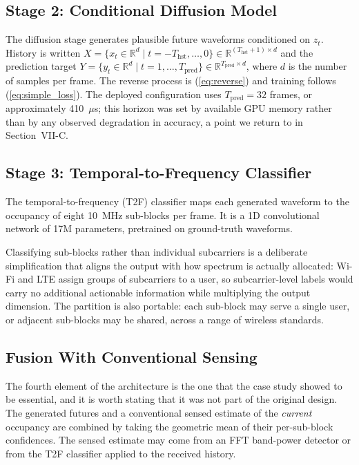 \documentclass[lettersize,journal]{IEEEtran}
\newcommand{\us}{\ensuremath{\mu}s}
\begin{document}
\subsection{\textbf{Stage 2: Conditional Diffusion Model}}
The diffusion stage generates plausible future waveforms conditioned on
$z_t$. History is written
$X = \{x_t \in \mathbb{R}^d \mid t = -T_{\mathrm{hst}}, \ldots, 0\}
\in \mathbb{R}^{(T_{\mathrm{hst}}+1)\times d}$
and the prediction target
$Y = \{y_t \in \mathbb{R}^d \mid t = 1, \ldots, T_{\mathrm{pred}}\}
\in \mathbb{R}^{T_{\mathrm{pred}}\times d}$,
where $d$ is the number of samples per frame. The reverse process is
(\ref{eq:reverse}) and training follows (\ref{eq:simple_loss}). The
deployed configuration uses $T_{\mathrm{pred}} = 32$ frames, or
approximately 410~\us; this horizon was set by available GPU memory
rather than by any observed degradation in accuracy, a point we return
to in Section~VII-C.

\subsection{\textbf{Stage 3: Temporal-to-Frequency Classifier}}
The temporal-to-frequency (T2F) classifier maps each generated waveform
to the occupancy of eight 10~MHz sub-blocks per frame. It is a 1D
convolutional network of 17M parameters, pretrained on ground-truth
waveforms.

Classifying sub-blocks rather than individual subcarriers is a
deliberate simplification that aligns the output with how spectrum is
actually allocated: Wi-Fi and LTE assign groups of subcarriers to a
user, so subcarrier-level labels would carry no additional actionable
information while multiplying the output dimension. The partition is also
portable: each sub-block may serve a single user, or adjacent sub-blocks may be
shared, across a range of wireless standards.

\subsection{\textbf{Fusion With Conventional Sensing}}
The fourth element of the architecture is the one that the case study
showed to be essential, and it is worth stating that it was not part of
the original design. The generated futures and a conventional sensed
estimate of the \emph{current} occupancy are combined by taking the
geometric mean of their per-sub-block confidences. The sensed estimate
may come from an FFT band-power detector or from the T2F classifier
applied to the received history.
\end{document}
